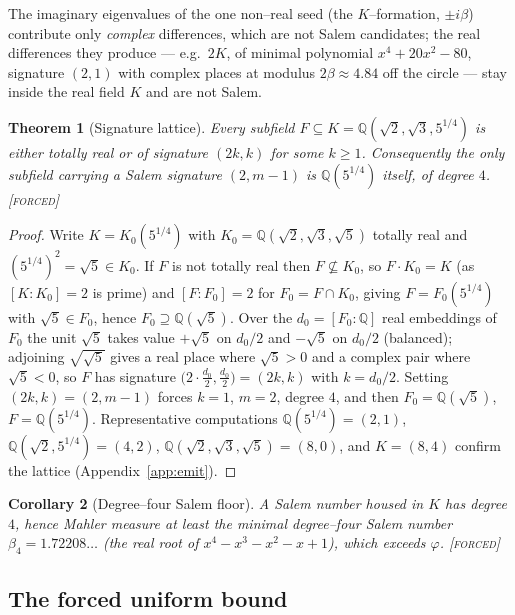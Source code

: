 \documentclass[11pt]{article}
\theoremstyle{plain}
\newtheorem{theorem}{Theorem}[section]
\newtheorem{corollary}[theorem]{Corollary}
\theoremstyle{definition}
\theoremstyle{remark}
\newcommand{\forced}{\textcolor{forcedc}{\textsc{[forced]}}}
\newcommand{\Q}{\mathbb{Q}}
\begin{document}
The imaginary eigenvalues of the one non--real seed (the $K$--formation, $\pm i\beta$) contribute only \emph{complex} differences, which are not Salem candidates; the real differences they produce --- e.g.\ $2K$, of minimal polynomial $x^4+20x^2-80$, signature $(2,1)$ with complex places at modulus $2\beta\approx4.84$ off the circle --- stay inside the real field $K$ and are not Salem.

\begin{theorem}[Signature lattice]\label{thm:siglattice}
Every subfield $F\subseteq K=\Q(\sqrt2,\sqrt3,5^{1/4})$ is either totally real or of signature $(2k,k)$ for some $k\ge1$. Consequently the only subfield carrying a Salem signature $(2,m-1)$ is $\Q(5^{1/4})$ itself, of degree $4$. \forced
\end{theorem}

\begin{proof}
Write $K=K_0(5^{1/4})$ with $K_0=\Q(\sqrt2,\sqrt3,\sqrt5)$ totally real and $(5^{1/4})^2=\sqrt5\in K_0$. If $F$ is not totally real then $F\not\subseteq K_0$, so $F\cdot K_0=K$ (as $[K:K_0]=2$ is prime) and $[F:F_0]=2$ for $F_0=F\cap K_0$, giving $F=F_0(5^{1/4})$ with $\sqrt5\in F_0$, hence $F_0\supseteq\Q(\sqrt5)$. Over the $d_0=[F_0:\Q]$ real embeddings of $F_0$ the unit $\sqrt5$ takes value $+\sqrt5$ on $d_0/2$ and $-\sqrt5$ on $d_0/2$ (balanced); adjoining $\sqrt{\sqrt5}$ gives a real place where $\sqrt5>0$ and a complex pair where $\sqrt5<0$, so $F$ has signature $\big(2\cdot\tfrac{d_0}2,\tfrac{d_0}2\big)=(2k,k)$ with $k=d_0/2$. Setting $(2k,k)=(2,m-1)$ forces $k=1$, $m=2$, degree $4$, and then $F_0=\Q(\sqrt5)$, $F=\Q(5^{1/4})$. Representative computations $\Q(5^{1/4})=(2,1)$, $\Q(\sqrt2,5^{1/4})=(4,2)$, $\Q(\sqrt2,\sqrt3,\sqrt5)=(8,0)$, and $K=(8,4)$ confirm the lattice (Appendix~\ref{app:emit}). \end{proof}

\begin{corollary}[Degree--four Salem floor]\label{cor:deg4}
A Salem number housed in $K$ has degree $4$, hence Mahler measure at least the minimal degree--four Salem number $\beta_4=1.72208\ldots$ (the real root of $x^4-x^3-x^2-x+1$), which exceeds $\varphi$. \forced
\end{corollary}

\subsection{The forced uniform bound}\label{sec:forcedbound}
\end{document}
